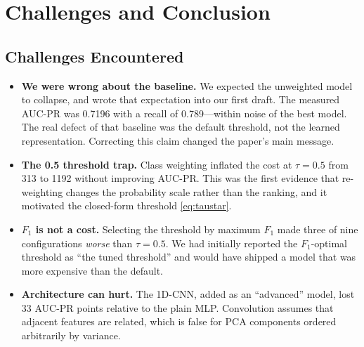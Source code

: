 \documentclass[conference]{IEEEtran}
\begin{document}

\section{Challenges and Conclusion}
\label{sec:conclusion}

\subsection{Challenges Encountered}
\begin{itemize}
  \item \textbf{We were wrong about the baseline.} We expected the unweighted
        model to collapse, and wrote that expectation into our first draft. The
        measured AUC-PR was 0.7196 with a recall of 0.789---within noise of the
        best model. The real defect of that baseline was the default threshold,
        not the learned representation. Correcting this claim changed the
        paper's main message.
  \item \textbf{The 0.5 threshold trap.} Class weighting inflated the cost at
        $\tau=0.5$ from 313 to 1192 without improving AUC-PR. This was the
        first evidence that re-weighting changes the probability scale rather
        than the ranking, and it motivated the closed-form threshold
        \eqref{eq:taustar}.
  \item \textbf{$F_1$ is not a cost.} Selecting the threshold by maximum $F_1$
        made three of nine configurations \emph{worse} than $\tau=0.5$. We had
        initially reported the $F_1$-optimal threshold as ``the tuned
        threshold'' and would have shipped a model that was more expensive than
        the default.
  \item \textbf{Architecture can hurt.} The 1D-CNN, added as an ``advanced''
        model, lost 33 AUC-PR points relative to the plain MLP. Convolution
        assumes that adjacent features are related, which is false for PCA
        components ordered arbitrarily by variance.
\end{itemize}
\end{document}
